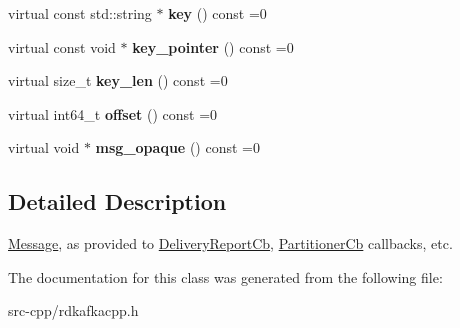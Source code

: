 \begin{DoxyCompactItemize}
\item 
\hypertarget{classRdKafka_1_1Message_a2430de7003342977001c9bab7604f152}{virtual const std\-::string $\ast$ {\bfseries key} () const =0}\label{classRdKafka_1_1Message_a2430de7003342977001c9bab7604f152}

\item 
\hypertarget{classRdKafka_1_1Message_a565d08ab88de128aca7efb57c3ed6c15}{virtual const void $\ast$ {\bfseries key\-\_\-pointer} () const =0}\label{classRdKafka_1_1Message_a565d08ab88de128aca7efb57c3ed6c15}

\item 
\hypertarget{classRdKafka_1_1Message_acde2505155defd52a279950113447dbb}{virtual size\-\_\-t {\bfseries key\-\_\-len} () const =0}\label{classRdKafka_1_1Message_acde2505155defd52a279950113447dbb}

\item 
\hypertarget{classRdKafka_1_1Message_a5a8efc75fd27f8839997fc506776db67}{virtual int64\-\_\-t {\bfseries offset} () const =0}\label{classRdKafka_1_1Message_a5a8efc75fd27f8839997fc506776db67}

\item 
\hypertarget{classRdKafka_1_1Message_ae13ce414d2c6ad68ddefc4ccca640f17}{virtual void $\ast$ {\bfseries msg\-\_\-opaque} () const =0}\label{classRdKafka_1_1Message_ae13ce414d2c6ad68ddefc4ccca640f17}

\end{DoxyCompactItemize}


\subsection{Detailed Description}
\hyperlink{classRdKafka_1_1Message}{Message}, as provided to \hyperlink{classRdKafka_1_1DeliveryReportCb}{Delivery\-Report\-Cb}, \hyperlink{classRdKafka_1_1PartitionerCb}{Partitioner\-Cb} callbacks, etc. 

The documentation for this class was generated from the following file\-:\begin{DoxyCompactItemize}
\item 
src-\/cpp/rdkafkacpp.\-h\end{DoxyCompactItemize}
